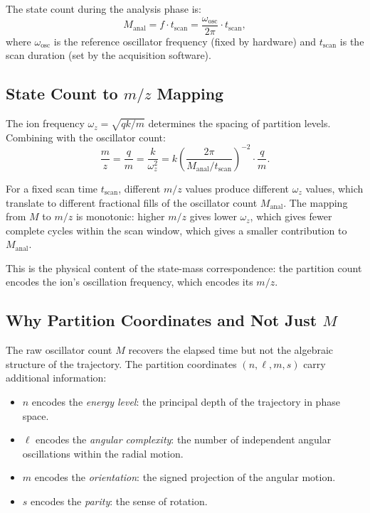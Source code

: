 \documentclass[twocolumn,10pt]{article}
\begin{document}
The state count during the analysis phase is:
\begin{equation}
    M_{\mathrm{anal}} = f \cdot t_{\mathrm{scan}} = \frac{\omega_{\mathrm{osc}}}{2\pi} \cdot t_{\mathrm{scan}},
\end{equation}
where $\omega_{\mathrm{osc}}$ is the reference oscillator frequency (fixed by hardware) and $t_{\mathrm{scan}}$ is the scan duration (set by the acquisition software).

\subsection{State Count to $m/z$ Mapping}

The ion frequency $\omega_z = \sqrt{qk/m}$ determines the spacing of partition levels. Combining with the oscillator count:
\begin{equation}
    \frac{m}{z} = \frac{q}{m} = \frac{k}{\omega_z^2} = k\left(\frac{2\pi}{M_{\mathrm{anal}}/t_{\mathrm{scan}}}\right)^{-2} \cdot \frac{q}{m}.
\end{equation}

For a fixed scan time $t_{\mathrm{scan}}$, different $m/z$ values produce different $\omega_z$ values, which translate to different fractional fills of the oscillator count $M_{\mathrm{anal}}$. The mapping from $M$ to $m/z$ is monotonic: higher $m/z$ gives lower $\omega_z$, which gives fewer complete cycles within the scan window, which gives a smaller contribution to $M_{\mathrm{anal}}$.

This is the physical content of the state-mass correspondence: the partition count encodes the ion's oscillation frequency, which encodes its $m/z$.

\subsection{Why Partition Coordinates and Not Just $M$}

The raw oscillator count $M$ recovers the elapsed time but not the algebraic structure of the trajectory. The partition coordinates $(n, \ell, m, s)$ carry additional information:

\begin{itemize}
    \item $n$ encodes the \emph{energy level}: the principal depth of the trajectory in phase space.
    \item $\ell$ encodes the \emph{angular complexity}: the number of independent angular oscillations within the radial motion.
    \item $m$ encodes the \emph{orientation}: the signed projection of the angular motion.
    \item $s$ encodes the \emph{parity}: the sense of rotation.
\end{itemize}
\end{document}
